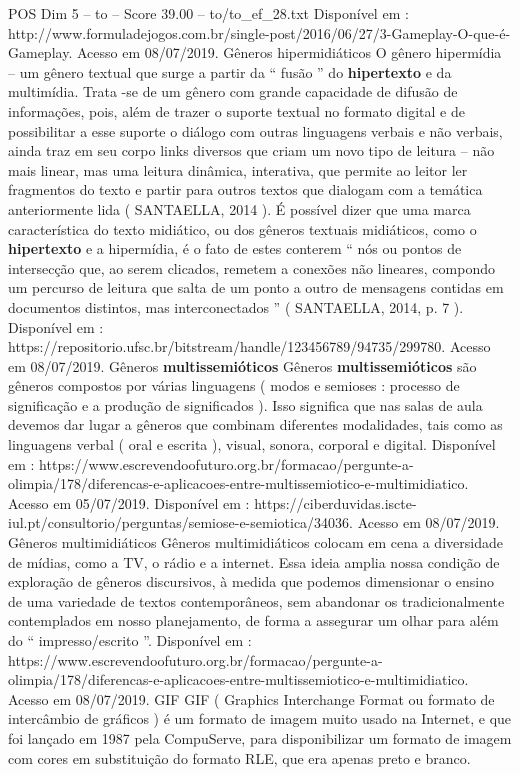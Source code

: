 \begin{textsample}{POS Dim 5 – to – Score 39.00 – to/to\_ef\_28.txt}
Disponível em : http://www.formuladejogos.com.br/single-post/2016/06/27/3-Gameplay-O-que-é-Gameplay.
Acesso em 08/07/2019.
Gêneros hipermidiáticos O gênero hipermídia – um gênero textual que surge a partir da “ fusão ” do \textbf{hipertexto} e da multimídia.
Trata -se de um gênero com grande capacidade de difusão de informações, pois, além de trazer o suporte textual no formato digital e de possibilitar a esse suporte o diálogo com outras linguagens verbais e não verbais, ainda traz em seu corpo links diversos que criam um novo tipo de leitura – não mais linear, mas uma leitura dinâmica, interativa, que permite ao leitor ler fragmentos do texto e partir para outros textos que dialogam com a temática anteriormente lida ( SANTAELLA, 2014 ).
É possível dizer que uma marca característica do texto midiático, ou dos gêneros textuais midiáticos, como o \textbf{hipertexto} e a hipermídia, é o fato de estes conterem “ nós ou pontos de intersecção que, ao serem clicados, remetem a conexões não lineares, compondo um percurso de leitura que salta de um ponto a outro de mensagens contidas em documentos distintos, mas interconectados ” ( SANTAELLA, 2014, p. 7 ).
Disponível em : https://repositorio.ufsc.br/bitstream/handle/123456789/94735/299780.
Acesso em 08/07/2019.
Gêneros \textbf{multissemióticos} Gêneros \textbf{multissemióticos} são gêneros compostos por várias linguagens ( modos e semioses : processo de significação e a produção de significados ).
Isso significa que nas salas de aula devemos dar lugar a gêneros que combinam diferentes modalidades, tais como as linguagens verbal ( oral e escrita ), visual, sonora, corporal e digital.
Disponível em : https://www.escrevendoofuturo.org.br/formacao/pergunte-a-olimpia/178/diferencas-e-aplicacoes-entre-multissemiotico-e-multimidiatico.
Acesso em 05/07/2019.
Disponível em : https://ciberduvidas.iscte-iul.pt/consultorio/perguntas/semiose-e-semiotica/34036.
Acesso em 08/07/2019.
Gêneros multimidiáticos Gêneros multimidiáticos colocam em cena a diversidade de mídias, como a TV, o rádio e a internet.
Essa ideia amplia nossa condição de exploração de gêneros discursivos, à medida que podemos dimensionar o ensino de uma variedade de textos contemporâneos, sem abandonar os tradicionalmente contemplados em nosso planejamento, de forma a assegurar um olhar para além do “ impresso/escrito ”.
Disponível em : https://www.escrevendoofuturo.org.br/formacao/pergunte-a-olimpia/178/diferencas-e-aplicacoes-entre-multissemiotico-e-multimidiatico.
Acesso em 08/07/2019.
GIF GIF ( Graphics Interchange Format ou formato de intercâmbio de gráficos ) é um formato de imagem muito usado na Internet, e que foi lançado em 1987 pela CompuServe, para disponibilizar um formato de imagem com cores em substituição do formato RLE, que era apenas preto e branco.

\end{textsample}
